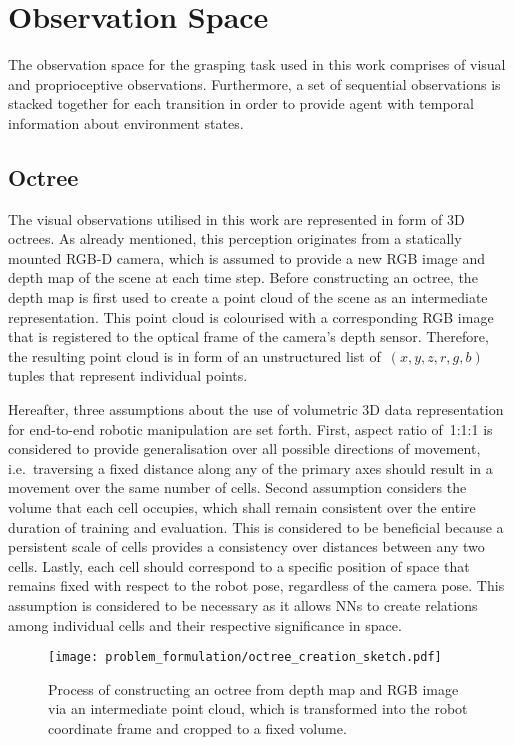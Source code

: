 \section{Observation Space}

The observation space for the grasping task used in this work comprises of visual and proprioceptive observations. Furthermore, a set of sequential observations is stacked together for each transition in order to provide agent with temporal information about environment states.


\subsection{Octree}\label{subsec:problem_formulation_octree}

The visual observations utilised in this work are represented in form of 3D octrees. As already mentioned, this perception originates from a statically mounted RGB-D camera, which is assumed to provide a new RGB image and depth map of the scene at each time step. Before constructing an octree, the depth map is first used to create a point cloud of the scene as an intermediate representation. This point cloud is colourised with a corresponding RGB image that is registered to the optical frame of the camera's depth sensor. Therefore, the resulting point cloud is in form of an unstructured list of~\((x,y,z,r,g,b)\) tuples that represent individual points.

Hereafter, three assumptions about the use of volumetric 3D data representation for end-to-end robotic manipulation are set forth. First, aspect ratio of~1:1:1 is considered to provide generalisation over all possible directions of movement, i.e.~traversing a fixed distance along any of the primary axes should result in a movement over the same number of cells. Second assumption considers the volume that each cell occupies, which shall remain consistent over the entire duration of training and evaluation. This is considered to be beneficial because a persistent scale of cells provides a consistency over distances between any two cells. Lastly, each cell should correspond to a specific position of space that remains fixed with respect to the robot pose, regardless of the camera pose. This assumption is considered to be necessary as it allows NNs to create relations among individual cells and their respective significance in space.

\begin{figure}[b]
    \centering
    \texttt{[image: problem\_formulation/octree\_creation\_sketch.pdf]}
    \caption{Process of constructing an octree from depth map and RGB image via an intermediate point cloud, which is transformed into the robot coordinate frame and cropped to a fixed volume.}
    \label{fig:problem_formulation_octree_creation_sketch}
\end{figure}

